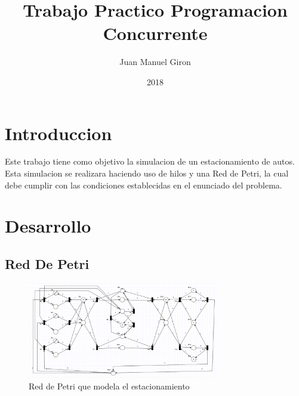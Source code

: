 \documentclass{article}
\title{Trabajo Practico Programacion Concurrente}
\author{Juan Manuel Giron}
\date{2018}
\begin{document}
\maketitle

\tableofcontents
\section{Introduccion}
Este trabajo tiene como objetivo la simulacion de un estacionamiento de autos. 
Esta simulacion se realizara haciendo uso de hilos y una Red de Petri, la cual 
debe cumplir con las condiciones establecidas en el enunciado del problema.
\section{Desarrollo}
	\subsection{Red De Petri}
	\begin{figure}[H]
		\centering
		\includegraphics[width=0.75\textwidth]{RedDePetri}
		\caption{Red de Petri que modela el estacionamiento}
		\label{fig:mesh1}
	\end{figure}
\end{document}

